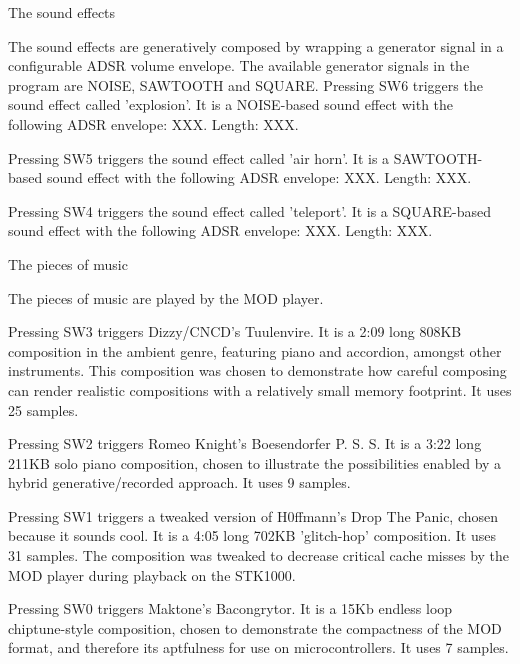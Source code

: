 The sound effects

The sound effects are generatively composed by wrapping a generator signal in a configurable ADSR volume envelope.
The available generator signals in the program are NOISE, SAWTOOTH and SQUARE.
Pressing SW6 triggers the sound effect called 'explosion'.
It is a NOISE-based sound effect with the following ADSR envelope: XXX.
Length: XXX.

Pressing SW5 triggers the sound effect called 'air horn'.
It is a SAWTOOTH-based sound effect with the following ADSR envelope: XXX.
Length: XXX.

Pressing SW4 triggers the sound effect called 'teleport'.
It is a SQUARE-based sound effect with the following ADSR envelope: XXX.
Length: XXX.


The pieces of music

The pieces of music are played by the MOD player.

Pressing SW3 triggers Dizzy/CNCD's Tuulenvire.
It is a 2:09 long 808KB composition in the ambient genre, featuring piano and accordion, amongst other instruments.
This composition was chosen to demonstrate how careful composing can render realistic compositions with a relatively small memory footprint.
It uses 25 samples.

Pressing SW2 triggers Romeo Knight's Boesendorfer P. S. S.
It is a 3:22 long 211KB solo piano composition, chosen to illustrate the possibilities enabled by a hybrid generative/recorded approach.
It uses 9 samples.

Pressing SW1 triggers a tweaked version of H0ffmann's Drop The Panic, chosen because it sounds cool.
It is a 4:05 long 702KB 'glitch-hop' composition.
It uses 31 samples.
The composition was tweaked to decrease critical cache misses by the MOD player during playback on the STK1000.

Pressing SW0 triggers Maktone's Bacongrytor.
It is a 15Kb endless loop chiptune-style composition, chosen to demonstrate the compactness of the MOD format, and therefore its aptfulness for use on microcontrollers.
It uses 7 samples.
